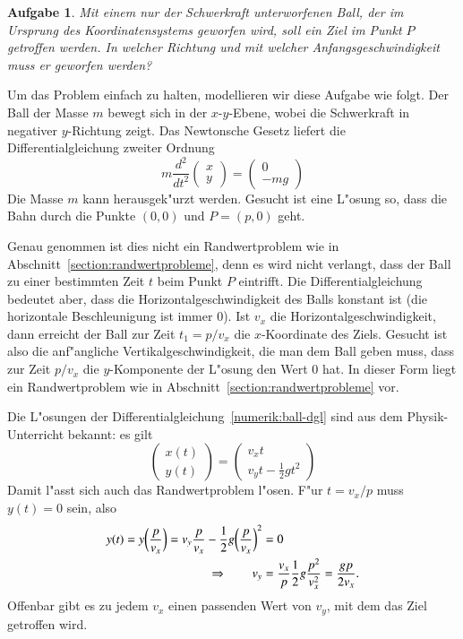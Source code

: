 \newtheorem{aufgabe}{Aufgabe}[chapter]
\begin{aufgabe}
\label{numerik:aufgabe-ball}
Mit einem nur der Schwerkraft unterworfenen Ball, der im Ursprung des
Koordinatensystems geworfen wird, soll ein Ziel im Punkt $P$ getroffen
werden.
In welcher Richtung und mit welcher Anfangsgeschwindigkeit muss er geworfen
werden?
\end{aufgabe}

Um das Problem einfach zu halten, modellieren wir diese Aufgabe wie
folgt.
Der Ball der Masse $m$ bewegt sich in der $x$-$y$-Ebene, wobei die
Schwerkraft in negativer $y$-Richtung zeigt.
Das Newtonsche Gesetz liefert die Differentialgleichung zweiter Ordnung
\begin{equation}
m\frac{d^2}{dt^2}\begin{pmatrix}x\\y\end{pmatrix}
=
\begin{pmatrix}
0\\-mg
\end{pmatrix}
\label{numerik:ball-dgl}
\end{equation}
Die Masse $m$ kann herausgek"urzt werden.
Gesucht ist eine L"osung so, dass die Bahn durch die Punkte $(0,0)$
und $P=(p,0)$ geht.

Genau genommen ist dies nicht ein Randwertproblem wie in 
Abschnitt~\ref{section:randwertprobleme}, denn es wird nicht verlangt,
dass der Ball zu einer bestimmten Zeit $t$ beim Punkt $P$ eintrifft.
Die Differentialgleichung bedeutet aber, dass die Horizontalgeschwindigkeit
des Balls konstant ist (die horizontale Beschleunigung ist immer $0$).
Ist $v_x$ die Horizontalgeschwindigkeit, dann erreicht der Ball zur
Zeit $t_1=p/v_x$ die $x$-Koordinate des Ziels.
Gesucht ist also die anf"angliche Vertikalgeschwindigkeit, die man
dem Ball geben muss, dass zur Zeit $p/v_x$ die $y$-Komponente
der L"osung den Wert $0$ hat.
In dieser Form liegt ein Randwertproblem wie in
Abschnitt~\ref{section:randwertprobleme} vor.

Die L"osungen der Differentialgleichung~\ref{numerik:ball-dgl} sind aus
dem Physik-Unterricht bekannt:
es gilt
\begin{equation}
\begin{pmatrix}x(t)\\y(t)\end{pmatrix}
=
\begin{pmatrix}v_xt\\ v_yt-\frac12gt^2\end{pmatrix}
\end{equation}
Damit l"asst sich auch das Randwertproblem l"osen.
F"ur $t=v_x/p$ muss $y(t)=0$ sein, also
\begin{align}
y(t)=y\biggl(\frac{p}{v_x}\biggr)
=v_y\frac{p}{v_x}-\frac12g\biggl(\frac{p}{v_x}\biggr)^2&=0
\notag
\\
\Rightarrow\qquad
v_y
&=
\frac{v_x}p\frac12g\frac{p^2}{v_x^2}=\frac{gp}{2v_x}.
\label{numerik:ball-bedingung}
\end{align}
Offenbar gibt es zu jedem $v_x$ einen passenden Wert von $v_y$,
mit dem das Ziel getroffen wird.

